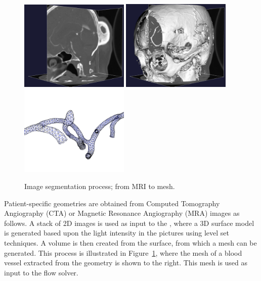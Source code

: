 \begin{figure}
  \begin{center}
      \includegraphics[width=5.2cm]{chapters/kvs-2/pdf/stacks.pdf}
      \includegraphics[width=5.2cm]{chapters/kvs-2/pdf/3d.pdf}
      \includegraphics[width=5.2cm]{chapters/kvs-2/pdf/viper3.pdf}
  \end{center}
  \caption{Image segmentation process; from MRI to mesh.}
\label{fig:kvs-2:imagseg}\end{figure}

Patient-specific geometries are obtained from Computed Tomography
Angiography (CTA) or Magnetic Resonance Angiography (MRA) images as
follows. A stack of 2D images is used as input to the \citet{vmtk},
where a 3D surface model is generated based upon the light intensity
in the pictures using level set techniques. A volume is then created
from the surface, from which a mesh can be generated. This process is
illustrated in Figure~\ref{fig:kvs-2:imagseg}, where the mesh of a
blood vessel extracted from the geometry is shown to the right. This
mesh is used as input to the flow solver.

